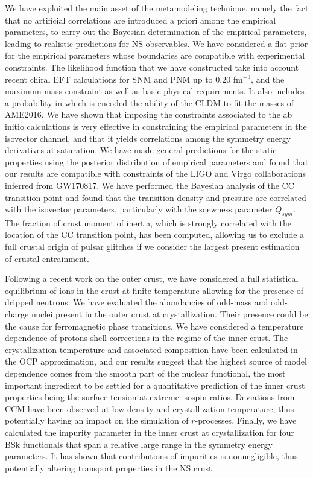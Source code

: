 We have exploited the main asset of the metamodeling technique, namely the 
fact that no artificial correlations are introduced a priori among the 
empirical parameters, to carry out the Bayesian determination of the empirical
parameters, leading to realistic predictions for NS observables. We have
considered a flat prior for the empirical parameters whose boundaries are
compatible with experimental constraints. 
The likelihood function that we have constructed take into account recent 
chiral EFT calculations for SNM and PNM up to $0.20$ fm$^{-3}$, and 
the maximum mass constraint as well as basic physical requirements. 
It also includes a probability in which is encoded the ability of the CLDM to 
fit the masses of AME2016. We have shown that imposing the constraints
associated to the ab initio calculations is very effective in constraining the 
empirical parameters in the isovector channel, and that it yields 
correlations among the symmetry energy derivatives at saturation.
We have made general predictions for the static properties using the posterior 
distribution of empirical parameters and found that our results are compatible 
with constraints of the LIGO and Virgo collaborations inferred from GW170817.
We have performed the Bayesian analysis of the CC transition point and 
found that the transition density and pressure are correlated with the 
isovector parameters, particularly with the sqewness parameter $Q_{sym}$.
The fraction of crust moment of inertia, which is strongly correlated with the 
location of the CC transition point, has been computed, allowing us to exclude 
a full crustal origin of pulsar glitches if we consider the largest present 
estimation of crustal entrainment. 

Following a recent work on the outer crust, we have considered a full
statistical equilibrium of ions in the crust at finite temperature allowing for 
the presence of dripped neutrons. We have evaluated the abundancies of odd-mass 
and odd-charge nuclei present in the outer crust at crystallization. Their
presence could be the cause for ferromagnetic phase transitions.
We have considered a temperature dependence of protons shell corrections in the 
regime of the inner crust. The crystallization temperature and associated
composition have been calculated in the OCP approximation, and our results
suggest that the highest source of model dependence comes from the smooth part
of the nuclear functional, the most important ingredient to be settled for a
quantitative prediction of the inner crust properties being the surface tension
at extreme isospin ratios. 
Deviations from CCM have been observed at low density and crystallization
temperature, thus potentially having an impact on the simulation of 
$r$-processes.
Finally, we have calculated the impurity parameter in the inner crust at 
crystallization for four BSk functionals that span a relative large range in
the symmetry energy parameters. It has shown that contributions of impurities 
is nonnegligible, thus potentially altering transport properties in the NS 
crust.
\\


